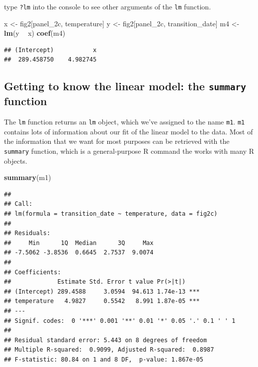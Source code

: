 \documentclass[]{book}
\newenvironment{Shaded}{\begin{snugshade}}{\end{snugshade}}
\newcommand{\KeywordTok}[1]{\textcolor[rgb]{0.13,0.29,0.53}{\textbf{#1}}}
\newcommand{\NormalTok}[1]{#1}
\newcommand{\OperatorTok}[1]{\textcolor[rgb]{0.81,0.36,0.00}{\textbf{#1}}}
\newcommand{\StringTok}[1]{\textcolor[rgb]{0.31,0.60,0.02}{#1}}
\begin{document}
type \texttt{?lm} into the console to see other arguments of the \texttt{lm} function.

\begin{Shaded}
\begin{Highlighting}[]
\NormalTok{x <-}\StringTok{ }\NormalTok{fig2[panel_2c, temperature]}
\NormalTok{y <-}\StringTok{ }\NormalTok{fig2[panel_2c, transition_date]}
\NormalTok{m4 <-}\StringTok{ }\KeywordTok{lm}\NormalTok{(y }\OperatorTok{~}\StringTok{ }\NormalTok{x)}
\KeywordTok{coef}\NormalTok{(m4)}
\end{Highlighting}
\end{Shaded}

\begin{verbatim}
## (Intercept)           x 
##  289.458750    4.982745
\end{verbatim}

\hypertarget{getting-to-know-the-linear-model-the-summary-function}{%
\subsection{\texorpdfstring{Getting to know the linear model: the \texttt{summary} function}{Getting to know the linear model: the summary function}}\label{getting-to-know-the-linear-model-the-summary-function}}

The \texttt{lm} function returns an \texttt{lm} object, which we've assigned to the name \texttt{m1}. \texttt{m1} contains lots of information about our fit of the linear model to the data. Most of the information that we want for most purposes can be retrieved with the \texttt{summary} function, which is a general-purpose R command the works with many R objects.

\begin{Shaded}
\begin{Highlighting}[]
\KeywordTok{summary}\NormalTok{(m1)}
\end{Highlighting}
\end{Shaded}

\begin{verbatim}
## 
## Call:
## lm(formula = transition_date ~ temperature, data = fig2c)
## 
## Residuals:
##     Min      1Q  Median      3Q     Max 
## -7.5062 -3.8536  0.6645  2.7537  9.0074 
## 
## Coefficients:
##             Estimate Std. Error t value Pr(>|t|)    
## (Intercept) 289.4588     3.0594  94.613 1.74e-13 ***
## temperature   4.9827     0.5542   8.991 1.87e-05 ***
## ---
## Signif. codes:  0 '***' 0.001 '**' 0.01 '*' 0.05 '.' 0.1 ' ' 1
## 
## Residual standard error: 5.443 on 8 degrees of freedom
## Multiple R-squared:  0.9099, Adjusted R-squared:  0.8987 
## F-statistic: 80.84 on 1 and 8 DF,  p-value: 1.867e-05
\end{verbatim}
\end{document}

